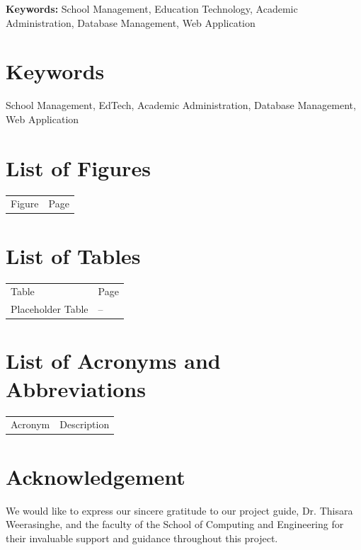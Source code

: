 \documentclass[12pt,a4paper]{report}
\begin{document}
\textbf{Keywords:} School Management, Education Technology, Academic Administration, Database Management, Web Application

\newpage
\section*{Keywords}
School Management, EdTech, Academic Administration, Database Management, Web Application

\section*{List of Figures}
\begin{longtable}{p{}p{}}
    Figure & Page \\
\end{longtable}

\section*{List of Tables}
\begin{longtable}{p{}p{}}
    Table & Page \\
    Placeholder Table & -- \\
\end{longtable}

\section*{List of Acronyms and Abbreviations}
\begin{longtable}{p{}p{}}
    Acronym & Description \\
\end{longtable}

\section*{Acknowledgement}
We would like to express our sincere gratitude to our project guide, Dr. Thisara Weerasinghe, and the faculty of the School of Computing and Engineering for their invaluable support and guidance throughout this project.

\newpage
\tableofcontents
\newpage
\renewcommand{\thepage}{\arabic{page}} %
\setcounter{page}{1}
\end{document}
